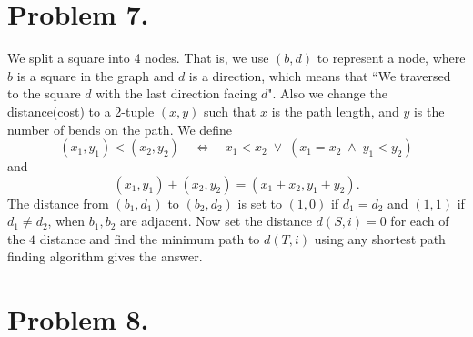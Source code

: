 \documentclass[12pt, a4paper]{article}
\begin{document}
\section{Problem 7.}
We split a square into 4 nodes. That is, 
we use $(b, d)$ to represent a node, where $b$ is 
a square in the graph and $d$ is a direction,
which means that ``We traversed to the square $d$ with
the last direction facing $d$". Also we change the 
distance(cost) to a 2-tuple $(x, y)$ such that 
$x$ is the path length, and $y$ is the number of bends
on the path. We define
\[ (x_1, y_1) < (x_2, y_2) \quad \Leftrightarrow \quad 
  x_1 < x_2 \; \lor \; (x_1 = x_2 \; \land \; y_1 < y_2) \] 
and
\[ (x_1, y_1) + (x_2, y_2) = (x_1 + x_2, y_1 + y_2). \]
The distance from $(b_1, d_1)$ to $(b_2, d_2)$ is set to
$(1, 0)$ if $d_1 = d_2$ and $(1, 1)$ if $d_1 \neq d_2$, 
when $b_1, b_2$ are adjacent. Now set the distance 
$d(S, i) = 0$ for each of the $4$ distance and find 
the minimum path to $d(T, i)$ using any shortest
path finding algorithm gives the answer.

\section{Problem 8.}
\end{document}
